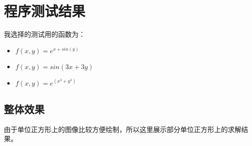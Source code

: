 \documentclass[12]{article}%
\begin{document}
\section{程序测试结果}
我选择的测试用的函数为：
\begin{itemize}
    \item $f(x,y)=e^{x+sin(y)}$
    \item $f(x,y)=sin(3x+3y)$
    \item $f(x,y)=e^(x^3+y^3)$
\end{itemize}

\subsection{整体效果}
由于单位正方形上的图像比较方便绘制，所以这里展示部分单位正方形上的求解结果。
\end{document}
